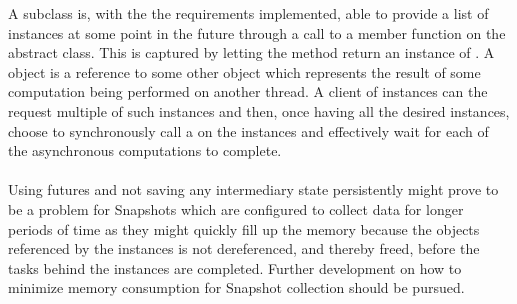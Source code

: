 A  subclass is, with the the requirements implemented, able to provide a list of  instances at some point in the future through a call to a member function on the abstract  class. This is captured by letting the method return an instance of . A  object is a reference to some other object which represents the result of some computation being performed on another thread. A client of  instances can the request multiple of such  instances and then, once having all the desired  instances, choose to synchronously call a  on the  instances and effectively wait for each of the asynchronous computations to complete.
\\\\
Using futures and not saving any intermediary state persistently might prove to be a problem for Snapshots which are configured to collect data for longer periods of time as they might quickly fill up the memory because the objects referenced by the  instances is not dereferenced, and thereby freed, before the tasks behind the  instances are completed. Further development on how to minimize memory consumption for Snapshot collection should be pursued.
